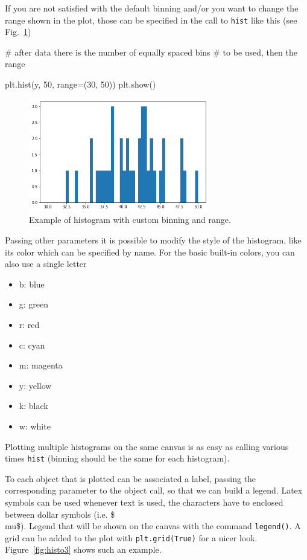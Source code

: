 \begin{ipython}
If you are not satisfied with the default binning and/or you want to
change the range shown in the plot, those can be specified in the call
to \texttt{hist} like this (see Fig.~\ref{fig:histo2})

\begin{ipython}
# after data there is the number of equally spaced bins
# to be used, then the range

plt.hist(y, 50, range=(30, 50))
plt.show()
\end{ipython}

\begin{figure}[htb]
	\centering
	\includegraphics[width=0.7\textwidth]{figures/histo2}
	\caption{Example of histogram with custom binning and range.}
	\label{fig:histo2}
\end{figure}

Passing other parameters it is possible to modify the style of the
histogram, like its color which can be specified by name. For
the basic built-in colors, you can also use a single letter

\begin{itemize}
	\tightlist
	\item
	b: blue
	\item
	g: green
	\item
	r: red
	\item
	c: cyan
	\item
	m: magenta
	\item
	y: yellow
	\item
	k: black
	\item
	w: white
\end{itemize}

Plotting multiple histograms on the same canvas is as easy as calling
various times \texttt{hist} (binning should be the same for each
histogram).

To each object that is plotted can be associated a label, passing the
corresponding parameter to the object call, so that we can build a
legend. Latex symbols can be used whenever text is used, the characters
have to enclosed between dollar symbols (i.e. \$\\mu\$). Legend that
will be shown on the canvas with the command \texttt{legend()}.
A grid can be added to the plot with \texttt{plt.grid(True)} for a nicer
look. Figure~\ref{fig:histo3} shows such an example.


\end{ipython}
